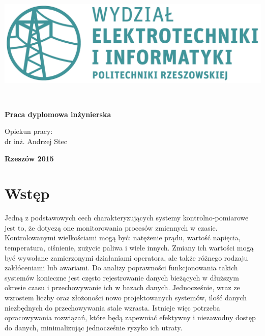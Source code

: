 \documentclass[a4paper,polish,12pt,twoside]{article}
\newcommand{\WorkLineSpread}{1.5}
\def \docsection#1{\clearpage\section{#1}}
\begin{document}
	\begin{titlepage}
	
	\vspace{2cm}

	\centering \hspace*{1.5cm}\includegraphics[width=14cm]{mojpieknywydzial}

	\vspace{2.5cm}


	\vspace{2cm} 

	 \\

	\vspace{5cm}

	\centering \large \textbf{Praca dyplomowa inżynierska}

	\vspace{2.5cm}

	\linespread{1}
	Opiekun pracy: \\
	dr inż. Andrzej Stec
	\linespread{\WorkLineSpread}
	\vspace{1cm}

	\large \textbf{Rzeszów 2015}

	\end{titlepage}

	\newpage
    
	\tableofcontents

	\newpage

    \docsection{Wstęp}
	Jedną z podstawowych cech charakteryzujących systemy kontrolno-pomiarowe jest to, że dotyczą one monitorowania procesów zmiennych w czasie. Kontrolowanymi wielkościami mogą być: natężenie prądu, wartość napięcia, temperatura, ciśnienie, zużycie paliwa i wiele innych. Zmiany ich wartości mogą być wywołane zamierzonymi działaniami operatora, ale także różnego rodzaju zakłóceniami lub awariami. Do analizy poprawności funkcjonowania takich systemów konieczne jest często rejestrowanie danych bieżących w dłuższym okresie czasu i przechowywanie ich w bazach danych. Jednocześnie, wraz ze wzrostem liczby oraz złożoności nowo projektowanych systemów, ilość danych niezbędnych do przechowywania stale wzrasta. Istnieje więc potrzeba opracowywania rozwiązań, które będą zapewniać efektywny i niezawodny dostęp do danych, minimalizując jednocześnie ryzyko ich utraty.
\end{document}
